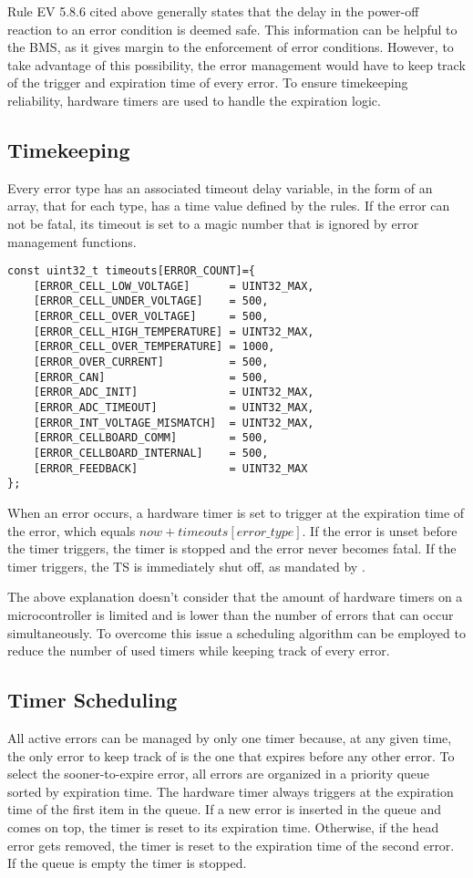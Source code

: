 Rule EV 5.8.6 cited above generally states that the delay in the power-off reaction to an error condition is deemed safe. This information can be helpful to the BMS, as it gives margin to the enforcement of error conditions. However, to take advantage of this possibility, the error management would have to keep track of the trigger and expiration time of every error. To ensure timekeeping reliability, hardware timers are used to handle the expiration logic.

\subsection{Timekeeping}
Every error type has an associated timeout delay variable, in the form of an array, that for each type, has a time value defined by the rules. If the error can not be fatal, its timeout is set to a magic number that is ignored by error management functions.

\begin{verbatim}
const uint32_t timeouts[ERROR_COUNT]={
	[ERROR_CELL_LOW_VOLTAGE]      = UINT32_MAX,
	[ERROR_CELL_UNDER_VOLTAGE]    = 500,
	[ERROR_CELL_OVER_VOLTAGE]     = 500,
	[ERROR_CELL_HIGH_TEMPERATURE] = UINT32_MAX,
	[ERROR_CELL_OVER_TEMPERATURE] = 1000,
	[ERROR_OVER_CURRENT]          = 500,
	[ERROR_CAN]                   = 500,
	[ERROR_ADC_INIT]              = UINT32_MAX,
	[ERROR_ADC_TIMEOUT]           = UINT32_MAX,
	[ERROR_INT_VOLTAGE_MISMATCH]  = UINT32_MAX,
	[ERROR_CELLBOARD_COMM]        = 500,
	[ERROR_CELLBOARD_INTERNAL]    = 500,
	[ERROR_FEEDBACK]              = UINT32_MAX
};
\end{verbatim}

When an error occurs, a hardware timer is set to trigger at the expiration time of the error, which equals $now + timeouts[error\_type]$. If the error is unset before the timer triggers, the timer is stopped and the error never becomes fatal. If the timer triggers, the TS is immediately shut off, as mandated by \cite[EV 5.8.6]{fsg2020}.

The above explanation doesn't consider that the amount of hardware timers on a microcontroller is limited and is lower than the number of errors that can occur simultaneously. To overcome this issue a scheduling algorithm can be employed to reduce the number of used timers while keeping track of every error.

\subsection{Timer Scheduling}
All active errors can be managed by only one timer because, at any given time, the only error to keep track of is the one that expires before any other error.
To select the sooner-to-expire error, all errors are organized in a priority queue sorted by expiration time. The hardware timer always triggers at the expiration time of the first item in the queue. If a new error is inserted in the queue and comes on top, the timer is reset to its expiration time. Otherwise, if the head error gets removed, the timer is reset to the expiration time of the second error. If the queue is empty the timer is stopped.

